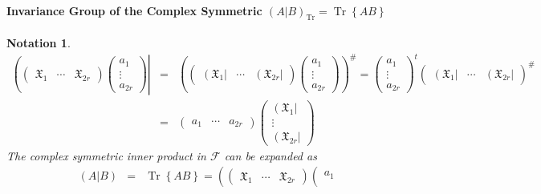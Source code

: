 \documentclass[aps, preprint]{revtex4}
\newtheorem{notation}[theorem]{Notation}
\begin{document}
\paragraph{Invariance Group of the Complex Symmetric $\left (\left .A\right \vert B\right )_{\ensuremath{\operatorname*{Tr}}} =\ensuremath{\operatorname*{Tr}} \left \{A B\right \}$}
\begin{notation}
\begin{align}\left (\left (\begin{array}{ccc}\mathfrak{X}_{1} & \cdots  & \mathfrak{X}_{2 r}\end{array}\right ) \left (\begin{array}{c}a_{1} \\
\vdots  \\
a_{2 r}\end{array}\right )\right \vert  &  = & \left (\left (\begin{array}{ccc}\left (\mathfrak{X}_{1}\right \vert  & \cdots  & \left (\mathfrak{X}_{2 r}\right \vert \end{array}\right ) \left (\begin{array}{c}a_{1} \\
\vdots  \\
a_{2 r}\end{array}\right )\right )^{\#} =\left (\begin{array}{c}a_{1} \\
\vdots  \\
a_{2 r}\end{array}\right )^{t} \left (\begin{array}{ccc}\left (\mathfrak{X}_{1}\right \vert  & \cdots  & \left (\mathfrak{X}_{2 r}\right \vert \end{array}\right )^{\#} \\
 &  = & \left (\begin{array}{ccc}a_{1} & \cdots  & a_{2 r}\end{array}\right ) \left (\begin{array}{c}\left (\mathfrak{X}_{1}\right \vert  \\
\vdots  \\
\left (\mathfrak{X}_{2 r}\right \vert \end{array}\right )\end{align}The complex symmetric inner product in $\mathcal{F}$ can be expanded as
\begin{align}\left (\left .A\right \vert B\right ) &  = & \ensuremath{\operatorname*{Tr}} \left \{A B\right \} =\left (\left .\left (\begin{array}{ccc}\mathfrak{X}_{1} & \cdots  & \mathfrak{X}_{2 r}\end{array}\right ) \left (\begin{array}{c}a_{1} \\

\end{array}
\end{align}
\end{notation}
\end{document}
